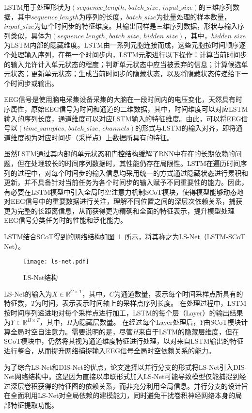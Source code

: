 LSTM用于处理形状为\((sequence\_length,\, batch\_size,\, input\_size)\)的三维序列数据，其中\(sequence\_length\)为序列的长度，\(batch\_size\)为批量处理的样本数量，\(input\_size\)为每个时间步的特征维度。其输出同样是三维序列数据，形状与输入序列类似，具体为\((sequence\_length,\,batch\_size,\, hidden\_size)\)，其中，\(hidden\_size\)为LSTM内部的隐藏维度。LSTM由一系列元胞连接而成，这些元胞按时间顺序逐个处理输入序列，在每一个时间步内，LSTM元胞进行以下操作：计算当前时间步的输入允许计入单元状态的程度；判断单元状态中应当被丢弃的信息；计算候选单元状态；更新单元状态；生成当前时间步的隐藏状态，以及将隐藏状态传递给下一个时间步或输出。

EEG信号是使用脑电采集设备采集的大脑在一段时间内的电压变化，天然具有时序属性，原始EEG信号为时间和通道的二维数据，其中，时间维度可以对应LSTM输入的序列长度，通道维度可以对应LSTM输入的特征维度。由此，可以将EEG信号以\((time\_samples,\, batch\_size,\, channels)\)的形式与LSTM的输入对齐，即将通道维度视为对应时间步（采样点）上数据所具有的特征。

虽然LSTM通过其内部的单元状态和门控结构缓解了RNN中存在的长期依赖的问题，但在处理较长的时间序列数据时，其性能仍存在局限性。LSTM在遍历时间序列的过程中，对每个时间步的输入信息均采用统一的方式通过隐藏状态进行累积和更新，并不具备针对当前任务为各个时间步的输入赋予不同重要性的能力。因此，有必要在LSTM模型中引入全局时空注意力机制SCoT模块，使得模型能够动态地对EEG信号中的重要数据进行关注，理解不同位置之间的深层次依赖关系，捕获更为完整的长距离信息，从而获得更为精确和全面的特征表示，提升模型处理EEG信号分类任务时的性能和泛化能力。

LSTM结合SCoT得到的网络结构如图~\ref{fig:ls}~所示，将其称之为LS-Net（LSTM-SCoT Net）。
\begin{figure}
    \centering
    \texttt{[image: ls-net.pdf]}
    \caption{LS-Net结构}
    \label{fig:ls}
\end{figure}
LS-Net的输入为\(X \in \mathbb{R}^{C \times T}\)，其中，\(C\)为通道数量，表示每个时间采样点所具有的特征数，\(T\)为时间，表示表示时间轴上的采样点序列长度。
在处理过程中，LSTM按时间序列递进地对每个采样点进行加工，LSTM的每个层（Layer）的输出结果为\(Y \in \mathbb{R}^{H \times T}\)，其中，\(H\)为隐藏层数量。
在经过每个Layer处理后，\(Y\)由SCoT模块计算全局时空自注意力。需要说明的是，尽管\(H\)来自于LSTM的隐藏层维度，但在SCoT模块中，仍然将其视为通道维度特征进行处理，以对来自LSTM输出的特征进行整合，从而提升网络捕捉输入EEG信号全局时空依赖关系的能力。

为了综合LS-Net和DIS-Net的优点，论文选择以并行分支的形式将LS-Net引入DIS-Net网络结构中。这是因为直接以串联形式加入LS-Net可能导致模型仅能捕捉到经过深层卷积获得的特征图的依赖关系，而非充分利用全局信息。并行分支的设计旨在全面利用LS-Net对全局依赖的建模能力，同时避免干扰卷积神经网络本身的局部特征提取功能。

